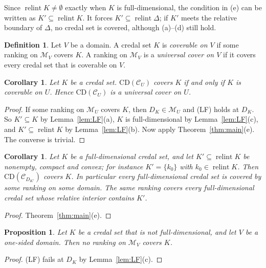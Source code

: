\documentclass[11pt]{article}
\newcommand{\M}{\mathcal{M}}
\newcommand{\CC}{\mathcal{C}}
\newcommand{\CD}{\mathrm{CD}}
\DeclareMathOperator{\relint}{relint}
\theoremstyle{plain}
\newtheorem{proposition}[theorem]{Proposition}
\newtheorem{corollary}[theorem]{Corollary}
\theoremstyle{definition}
\newtheorem{definition}[theorem]{Definition}
\theoremstyle{remark}
\begin{document}
Since $\relint K\ne\emptyset$ exactly when $K$ is full-dimensional, the condition in (e)
can be written as $K'\subseteq\relint K$. It forces $K'\subseteq\relint\Delta$; if $K'$
meets the relative boundary of $\Delta$, no credal set is covered, although (a)--(d) still
hold.

\begin{definition}\label{def:universal}
Let $V$ be a domain. A credal set $K$ is \emph{coverable on $V$} if some ranking on $\M_V$
covers $K$. A ranking on $\M_V$ is a \emph{universal cover on $V$} if it covers every
credal set that is coverable on $V$.
\end{definition}

\begin{corollary}\label{cor:universal}
Let $K$ be a credal set. $\CD(\CC_U)$ covers $K$ if and only if $K$ is coverable on $U$.
Hence $\CD(\CC_U)$ is a universal cover on $U$.
\end{corollary}

\begin{proof}
If some ranking on $\M_U$ covers $K$, then $D_K\in\M_U$ and (LF) holds at $D_K$. So
$K'\subseteq K$ by Lemma~\ref{lem:LF}(a), $K$ is full-dimensional by
Lemma~\ref{lem:LF}(c), and $K'\subseteq\relint K$ by Lemma~\ref{lem:LF}(b). Now apply
Theorem~\ref{thm:main}(e). The converse is trivial.
\end{proof}

\begin{corollary}\label{cor:every}
Let $K$ be a full-dimensional credal set, and let $K'\subseteq\relint K$ be nonempty,
compact and convex; for instance $K'=\{k_0\}$ with $k_0\in\relint K$. Then
$\CD(\CC_{D_{K'}})$ covers $K$. In particular every full-dimensional credal set is
covered by some ranking on some domain. The same ranking covers every full-dimensional
credal set whose relative interior contains $K'$.
\end{corollary}

\begin{proof}
Theorem~\ref{thm:main}(e).
\end{proof}

\begin{proposition}\label{prop:lowdim}
Let $K$ be a credal set that is not full-dimensional, and let $V$ be a one-sided domain.
Then no ranking on $\M_V$ covers $K$.
\end{proposition}

\begin{proof}
(LF) fails at $D_K$ by Lemma~\ref{lem:LF}(c).
\end{proof}
\end{document}
